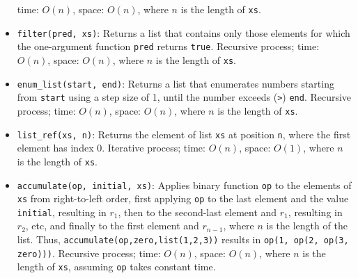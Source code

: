 \begin{itemize}
time: $O(n)$, space: $O(n)$, where $n$ is the length of \lstinline{xs}.
\item \lstinline{filter(pred, xs)}: Returns a list that contains
only those elements for which the one-argument function
\lstinline{pred}
returns \lstinline{true}.
Recursive process;
time: $O(n)$, space: $O(n)$, where $n$ is the length of \lstinline{xs}.
\item \lstinline{enum_list(start, end)}: Returns a list that enumerates
numbers starting from \lstinline{start} using a step size of 1, until
the number exceeds (\lstinline{>}) \lstinline{end}.
Recursive process;
time: $O(n)$, space: $O(n)$, where $n$ is the length of \lstinline{xs}.
\item \lstinline{list_ref(xs, n)}: Returns the element
of list \lstinline{xs} at position \lstinline{n}, 
where the first element has index 0.
Iterative process;
time: $O(n)$, space: $O(1)$, where $n$ is the length of \lstinline{xs}.
\item \lstinline{accumulate(op, initial, xs)}: Applies binary
function \lstinline{op} to the elements of \lstinline{xs} from
right-to-left order, first applying \lstinline{op} to the last element
and the value \lstinline{initial}, resulting in $r_1$, then to the 
second-last element and $r_1$, resulting in $r_2$, etc, and finally
to the first element and $r_{n-1}$, where $n$ is the length of the
list. Thus, \lstinline{accumulate(op,zero,list(1,2,3))} results in
\lstinline{op(1, op(2, op(3, zero)))}.
Recursive process;
time: $O(n)$, space: $O(n)$, where $n$ is the length of \lstinline{xs},
assuming \lstinline{op} takes constant time.
\end{itemize}
